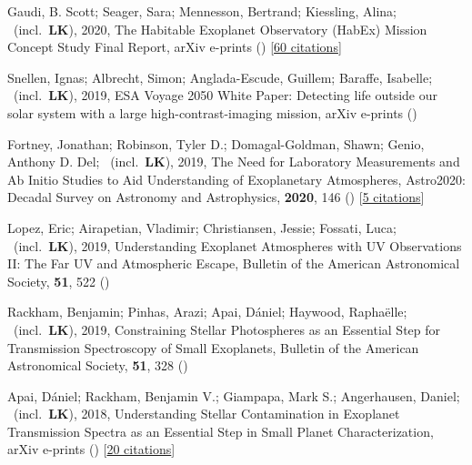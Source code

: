 \item[{\color{numcolor}\scriptsize9}] Gaudi, B. Scott; Seager, Sara; Mennesson, Bertrand; Kiessling, Alina; \etal\ (incl.\ \textbf{LK}), 2020, The Habitable Exoplanet Observatory (HabEx) Mission Concept Study Final Report, arXiv e-prints () [\href{https://ui.adsabs.harvard.edu/abs/2020arXiv200106683G}{60 citations}]

\item[{\color{numcolor}\scriptsize8}] Snellen, Ignas; Albrecht, Simon; Anglada-Escude, Guillem; Baraffe, Isabelle; \etal\ (incl.\ \textbf{LK}), 2019, ESA Voyage 2050 White Paper: Detecting life outside our solar system with a large high-contrast-imaging mission, arXiv e-prints ()

\item[{\color{numcolor}\scriptsize7}] Fortney, Jonathan; Robinson, Tyler D.; Domagal-Goldman, Shawn; Genio, Anthony D. Del; \etal\ (incl.\ \textbf{LK}), 2019, The Need for Laboratory Measurements and Ab Initio Studies to Aid Understanding of Exoplanetary Atmospheres, Astro2020: Decadal Survey on Astronomy and Astrophysics, \textbf{2020}, 146 () [\href{https://ui.adsabs.harvard.edu/abs/2019astro2020T.146F}{5 citations}]

\item[{\color{numcolor}\scriptsize6}] Lopez, Eric; Airapetian, Vladimir; Christiansen, Jessie; Fossati, Luca; \etal\ (incl.\ \textbf{LK}), 2019, Understanding Exoplanet Atmospheres with UV Observations II: The Far UV and Atmospheric Escape, Bulletin of the American Astronomical Society, \textbf{51}, 522 ()

\item[{\color{numcolor}\scriptsize5}] Rackham, Benjamin; Pinhas, Arazi; Apai, D{\'a}niel; Haywood, Rapha{\"e}lle; \etal\ (incl.\ \textbf{LK}), 2019, Constraining Stellar Photospheres as an Essential Step for Transmission Spectroscopy of Small Exoplanets, Bulletin of the American Astronomical Society, \textbf{51}, 328 ()

\item[{\color{numcolor}\scriptsize4}] Apai, D{\'a}niel; Rackham, Benjamin V.; Giampapa, Mark S.; Angerhausen, Daniel; \etal\ (incl.\ \textbf{LK}), 2018, Understanding Stellar Contamination in Exoplanet Transmission Spectra as an Essential Step in Small Planet Characterization, arXiv e-prints () [\href{https://ui.adsabs.harvard.edu/abs/2018arXiv180308708A}{20 citations}]

